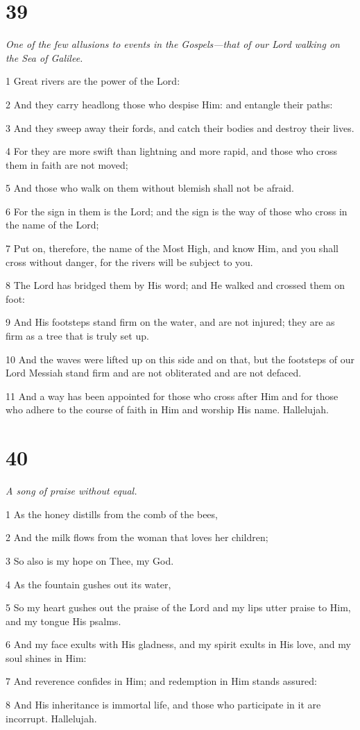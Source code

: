 \chapter{39}

\par \textit{One of the few allusions to events in the Gospels—that of our Lord walking on the Sea of Galilee.}

\par 1 Great rivers are the power of the Lord:
\par 2 And they carry headlong those who despise Him: and entangle their paths:
\par 3 And they sweep away their fords, and catch their bodies and destroy their lives.
\par 4 For they are more swift than lightning and more rapid, and those who cross them in faith are not moved;
\par 5 And those who walk on them without blemish shall not be afraid.
\par 6 For the sign in them is the Lord; and the sign is the way of those who cross in the name of the Lord;
\par 7 Put on, therefore, the name of the Most High, and know Him, and you shall cross without danger, for the rivers will be subject to you.
\par 8 The Lord has bridged them by His word; and He walked and crossed them on foot:
\par 9 And His footsteps stand firm on the water, and are not injured; they are as firm as a tree that is truly set up.
\par 10 And the waves were lifted up on this side and on that, but the footsteps of our Lord Messiah stand firm and are not obliterated and are not defaced.
\par 11 And a way has been appointed for those who cross after Him and for those who adhere to the course of faith in Him and worship His name. Hallelujah.

\chapter{40}

\par \textit{A song of praise without equal.}

\par 1 As the honey distills from the comb of the bees,
\par 2 And the milk flows from the woman that loves her children;
\par 3 So also is my hope on Thee, my God.
\par 4 As the fountain gushes out its water,
\par 5 So my heart gushes out the praise of the Lord and my lips utter praise to Him, and my tongue His psalms.
\par 6 And my face exults with His gladness, and my spirit exults in His love, and my soul shines in Him:
\par 7 And reverence confides in Him; and redemption in Him stands assured:
\par 8 And His inheritance is immortal life, and those who participate in it are incorrupt. Hallelujah.

